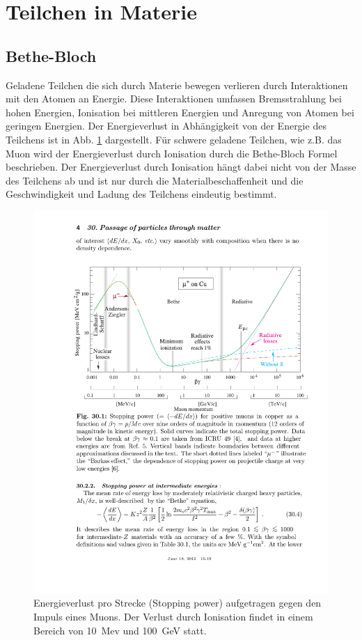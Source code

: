 \section{Teilchen in Materie}
\subsection{Bethe-Bloch}
Geladene Teilchen die sich durch Materie bewegen verlieren durch Interaktionen mit den Atomen an Energie. Diese Interaktionen umfassen Bremsstrahlung bei hohen Energien, Ionisation bei mittleren Energien und Anregung von Atomen bei geringen Energien. Der Energieverlust in Abhängigkeit von der Energie des Teilchens ist in Abb. \ref{fig:bethe} dargestellt. Für schwere geladene Teilchen, wie z.B. das Muon wird der Energieverlust durch Ionisation durch die Bethe-Bloch Formel beschrieben\cite{Passage_through_matter}. Der Energieverlust durch Ionisation hängt dabei nicht von der Masse des Teilchens ab und ist nur durch die Materialbeschaffenheit und die Geschwindigkeit und Ladung des Teilchens eindeutig bestimmt. 
\begin{figure}
\centering
\includegraphics[scale=0.7]{./input/bethe.pdf}\caption{Energieverlust pro Strecke (Stopping power) aufgetragen gegen den Impuls eines Muons. Der Verlust durch Ionisation findet in einem Bereich von 10~Mev und 100~GeV statt\cite{Passage_through_matter}.}\label{fig:bethe}
\end{figure}
